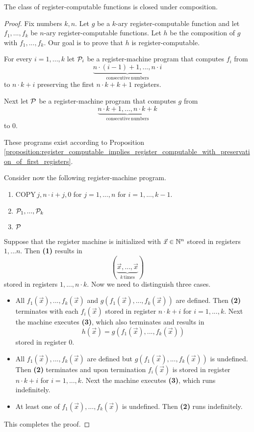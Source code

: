 \documentclass[10pt]{amsart}
\begin{document}
\begin{proposition}\label{proposition:register_computable_functions_closed_under_composition}
	The class of register-computable functions is closed under composition.
\end{proposition}
\begin{proof}
	Fix numbers $k,n$. Let $g$ be a $k$-ary register-computable function and let $f_1,...,f_k$ be $n$-ary register-computable functions. Let $h$ be the composition of $g$ with $f_1,...,f_k$. Our goal is to prove that $h$ is register-computable.

	For every $i = 1,...,k$ let ${\mathcal P}_i$ be a register-machine program that computes $f_i$ from
	$$\underbrace{n\cdot (i-1) + 1,...,n\cdot i}_{\mathrm{consecutive\,numbers}}$$
	to $n\cdot k + i$ preserving the first $n\cdot k + k + 1$ registers.

	Next let ${\mathcal P}$ be a register-machine program that computes $g$ from
	$$\underbrace{n\cdot k + 1,...,n\cdot k + k}_{\mathrm{consecutive\,numbers}}$$
	to $0$.

	These programs exist according to Proposition \ref{proposition:register_computable_implies_register_computable_with_preservation_of_first_registers}.

	Consider now the following register-machine program.
	\begin{enumerate}[label=\textbf{(\arabic*)}, leftmargin=3.0em]
		\item $\mathrm{COPY}\,j,n\cdot i + j,0$ for $j = 1,...,n$ for $i = 1,...,k - 1$.
		\item ${\mathcal P}_1,...,{\mathcal P}_k$
		\item ${\mathcal P}$
	\end{enumerate}
	Suppose that the register machine is initialized with $\vec{x} \in {\mathbb N}^{n}$ stored in registers $1,...n$. Then \textbf{(1)} results in
	$$\left(\underbrace{\vec{x},...,\vec{x}}_{k\mathrm{\,times}}\right)$$
	stored in registers $1,...,n\cdot k$. Now we need to distinguish three cases.
	\begin{itemize}
		\item All $f_1(\vec{x}),...,f_k(\vec{x})$ and $g\left(f_1(\vec{x}),...,f_k(\vec{x})\right)$ are defined. Then \textbf{(2)} terminates with each $f_i(\vec{x})$ stored in register $n\cdot k + i$ for $i = 1,...,k$. Next the machine executes \textbf{(3)}, which also terminates and results in
		      $$h(\vec{x}) = g\left(f_1(\vec{x}),...,f_k(\vec{x})\right)$$
		      stored in register $0$.
		\item  All $f_1(\vec{x}),...,f_k(\vec{x})$ are defined but $g\left(f_1(\vec{x}),...,f_k(\vec{x})\right)$ is undefined. Then \textbf{(2)} terminates and upon termination $f_i(\vec{x})$ is stored in register $n\cdot k + i$ for $i = 1,...,k$. Next the machine executes \textbf{(3)}, which runs indefinitely.
		\item At least one of $f_1(\vec{x}),...,f_k(\vec{x})$ is undefined. Then \textbf{(2)} runs indefinitely.
	\end{itemize}
	This completes the proof.
\end{proof}
\end{document}
